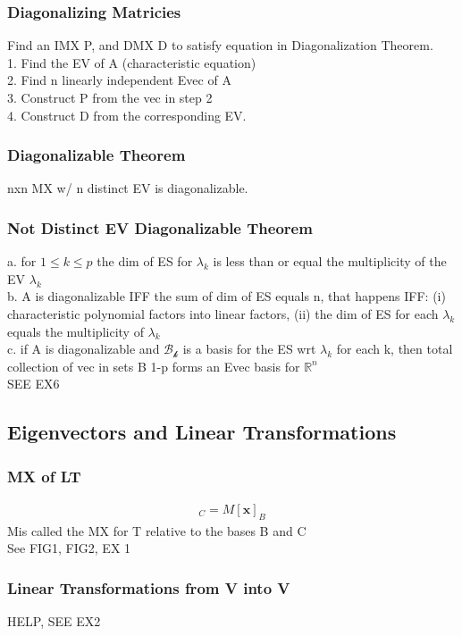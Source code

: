 \documentclass[12pt]{article}
\newcommand{\R}{\mathbb{R}}
\begin{document}
    \subsubsection{Diagonalizing Matricies}
        Find an IMX P, and DMX D  to satisfy equation in Diagonalization
        Theorem.\\
        1. Find the EV of A (characteristic equation) \\
        2. Find n linearly independent Evec of A \\
        3. Construct P from the vec in step 2\\
        4. Construct D from the corresponding EV.
    \subsubsection{Diagonalizable Theorem}
        nxn MX w/ n distinct EV is diagonalizable.
    \subsubsection{Not Distinct EV Diagonalizable Theorem}
        a. for $1\le k\le p$  the dim of ES for $\lambda _{k}$  is less
        than or equal the multiplicity of the EV $\lambda _{k}$  \\
        b. A is diagonalizable IFF the sum of dim of ES equals n,
        that happens IFF:
        (i) characteristic polynomial factors into linear factors,
        (ii) the dim of ES for each $\lambda _{k}$  equals the multiplicity
        of $\lambda _k$  \\
        c. if A is diagonalizable and $\mathcal{B_{k}}$  is a basis for the
        ES wrt $\lambda_k$  for each k, then total collection of vec
        in sets B 1-p forms an Evec basis for $\R^n$\\
        SEE EX6
\subsection{Eigenvectors and Linear Transformations}
    \subsubsection{MX of LT}
        \begin{align*}
            [T(\bm{x})]_C = M[\bm{x}]_B
        \end{align*}
        Mis called the MX for T relative to the bases B and C \\
        See FIG1, FIG2, EX 1
    \subsubsection{Linear Transformations from V into V}
        HELP, SEE EX2
\end{document}
